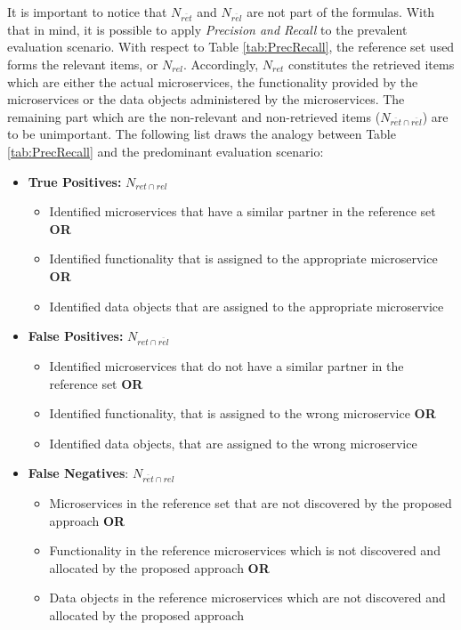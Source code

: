  
\noindent
It is important to notice that $N_{\overline{ret}}$ and $N_{\overline{rel}}$ are not part of the formulas. With that in mind, it is possible to apply \textit{Precision and Recall} to the prevalent evaluation scenario. With respect to Table \ref{tab:PrecRecall}, the reference set used forms the relevant items, or $N_{rel}$. Accordingly, $N_{ret}$ constitutes the retrieved items which are either the actual microservices, the functionality provided by the microservices or the data objects administered by the microservices.
The remaining part which are the non-relevant and non-retrieved items ($N_{\overline{ret}\cap \overline{rel}}$) are to be unimportant. The following list draws the analogy between Table \ref{tab:PrecRecall} and the predominant evaluation scenario:
\begin{itemize}
	\item \textbf{True Positives:}  $N_{ret\cap rel}$  
	
	\begin{itemize}
		\item Identified microservices that have a similar partner in the reference set \textbf{OR}
		\item Identified functionality that is assigned to the appropriate microservice \textbf{OR}
		\item Identified data objects that are assigned to the appropriate microservice
	\end{itemize}
	
	
	\item  \textbf{False Positives:}  $N_{ret\cap \overline{rel}}$ 
	\begin{itemize}
		\item Identified microservices that do not have a similar partner in the reference set \textbf{OR}
		\item Identified functionality, that is assigned to the wrong microservice  \textbf{OR}
		\item Identified data objects, that are assigned to the wrong microservice
	\end{itemize}
	
	\item \textbf{False Negatives}:  $N_{\overline{ret}\cap rel}$ 
		\begin{itemize}
		\item Microservices in the reference set that are not discovered by the proposed approach  \textbf{OR}
		\item Functionality in the reference microservices which is not discovered and allocated by the proposed approach  \textbf{OR}
		\item Data objects in the reference microservices which are not discovered and allocated by the proposed approach
	\end{itemize}
	

\end{itemize}
